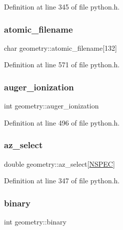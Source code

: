 Definition at line 345 of file python.\+h.

\mbox{\label{structgeometry_a6326be36064b6d068e89fc266ddf0f8f}} 
\subsubsection{\texorpdfstring{atomic\+\_\+filename}{atomic\_filename}}
{\footnotesize\ttfamily char geometry\+::atomic\+\_\+filename\mbox{[}132\mbox{]}}



Definition at line 571 of file python.\+h.

\mbox{\label{structgeometry_a2aa7780d01076f9c70aef2ea263276f9}} 
\subsubsection{\texorpdfstring{auger\+\_\+ionization}{auger\_ionization}}
{\footnotesize\ttfamily int geometry\+::auger\+\_\+ionization}



Definition at line 496 of file python.\+h.

\mbox{\label{structgeometry_a8c012380cab384d943962d3c36bdab4f}} 
\subsubsection{\texorpdfstring{az\+\_\+select}{az\_select}}
{\footnotesize\ttfamily double geometry\+::az\+\_\+select\mbox{[}\hyperlink{python_8h_ade1df1cb82ae4ef9a5c0cddb37d9a73b}{N\+S\+P\+EC}\mbox{]}}



Definition at line 347 of file python.\+h.

\mbox{\label{structgeometry_a39a1864fe337a607110ca812817ce4f4}} 
\subsubsection{\texorpdfstring{binary}{binary}}
{\footnotesize\ttfamily int geometry\+::binary}



